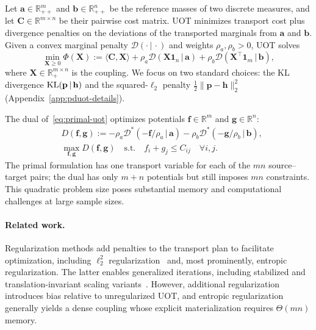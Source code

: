 Let $\mathbf{a}\in\mathbb R_{++}^m$ and $\mathbf{b}\in\mathbb R_{++}^n$ be the reference masses of two discrete measures, and let $\mathbf{C}\in\mathbb R^{m\times n}$ be their pairwise cost matrix.
UOT minimizes transport cost plus divergence penalties on the deviations of the transported marginals from $\mathbf{a}$ and $\mathbf{b}$.
Given a convex marginal penalty $\mathcal{D}(\cdot\,|\,\cdot)$ and weights $\rho_a,\rho_b>0$, UOT solves
\begin{equation}
\label{eq:primal-uot}
\min_{\mathbf{X}\geq 0} \Phi(\mathbf{X}):=\langle \mathbf{C},\mathbf{X}\rangle+\rho_a\mathcal{D}(\mathbf{X}\mathbf{1}_n\,|\,\mathbf{a})
+\rho_b\mathcal{D}(\mathbf{X}^\top\mathbf{1}_m\,|\,\mathbf{b}),
\end{equation}
where $\mathbf{X}\in\mathbb R_+^{m\times n}$ is the coupling.
We focus on two standard choices: the KL divergence $\operatorname{KL}(\mathbf{p}\,|\,\mathbf{h})$ and the squared-$\ell_2$ penalty $\frac{1}{2}\|\mathbf{p}-\mathbf{h}\|_2^2$ (Appendix~\ref{app:pduot-details}).

The dual of~\eqref{eq:primal-uot} optimizes potentials $\mathbf{f}\in\mathbb R^m$ and $\mathbf{g}\in\mathbb R^n$:
\begin{equation} 
\label{eq:dual-uot}
\begin{aligned}
&D(\mathbf{f},\mathbf{g}):=-\rho_a\mathcal{D}^*(-\mathbf{f}/\rho_a\,|\,\mathbf{a})-\rho_b\mathcal{D}^*(-\mathbf{g}/\rho_b\,|\,\mathbf{b}),\\
&\max_{\mathbf{f},\mathbf{g}}D(\mathbf{f},\mathbf{g})\quad\text{s.t.}\quad f_i+g_j\leq C_{ij}\quad\forall i,j.
\end{aligned}
\end{equation}
The primal formulation has one transport variable for each of the $mn$ source--target pairs; the dual has only $m+n$ potentials but still imposes $mn$ constraints.
This quadratic problem size poses substantial memory and computational challenges at large sample sizes.

\paragraph{Related work.}
Regularization methods add penalties to the transport plan to facilitate optimization, including $\ell_2^2$ regularization~\citep{nguyen2023unbalanced} and, most prominently, entropic regularization.
The latter enables generalized \sinkhorn iterations, including stabilized and translation-invariant scaling variants~\citep{chizat2018scaling,schmitzer2019stabilized,pham2020unbalanced,sejourne2022faster}.
However, additional regularization introduces bias relative to unregularized UOT, and entropic regularization generally yields a dense coupling whose explicit materialization requires $\Theta(mn)$ memory.

